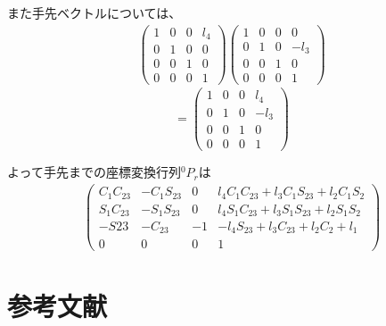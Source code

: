 \documentclass[a4j]{jarticle}			%
\begin{document}
\begin{multicols}{2}
また手先ベクトルについては、
\begin{equation*}
	\begin{array}{cc}
		\left( 
			\begin{array}{cccc}
				1 & 0 & 0 & l_4 \\
				0 & 1 & 0 & 0 \\
				0 & 0 & 1 & 0 \\
				0 & 0 & 0 & 1 
			\end{array}
		\right)
		\left( 
			\begin{array}{cccc}
				1 & 0 & 0 & 0 \\
				0 & 1 & 0 & -l_3 \\
				0 & 0 & 1 & 0 \\
				0 & 0 & 0 & 1 
			\end{array}
			\right)
	\end{array}
\end{equation*}
$$
	=\left( 
	\begin{array}{cccc}
		1 & 0 & 0 & l_4 \\
		0 & 1 & 0 & -l_3 \\
		0 & 0 & 1 & 0 \\
		0 & 0 & 0 & 1 
	\end{array}
	\right)
$$

よって手先までの座標変換行列$^{0}P_{r}$は
\tiny
\begin{equation*}
	\begin{array}{cc}
		\left( 
			\begin{array}{cccc}
				C_1C_{23} & -C_1S_{23} & 0 & l_4C_1C_{23}+l_3C_1S_{23}+l_2C_1S_2 \\
				S_1C_{23} & -S_1S_{23} & 0 & l_4S_1C_{23}+l_3S_1S_{23}+l_2S_1S_2 \\
				-S{23} & -C_{23} & -1 & -l_4S_{23}+l_3C_{23}+l_2C_2+l_1 \\
				0 & 0 & 0 & 1 
			\end{array}
		\right)
	\end{array}
\end{equation*}


\section{参考文献}


\end{multicols}
\end{document}
